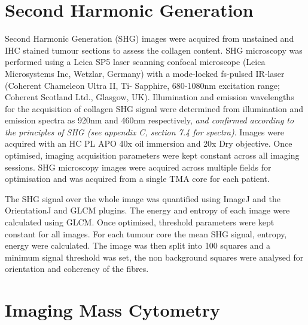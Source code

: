 \section{Second Harmonic Generation}

Second Harmonic Generation (SHG) images were acquired from unstained and IHC stained tumour
sections to assess the collagen content. SHG microscopy was
performed using a Leica SP5 laser scanning confocal microscope (Leica Microsystems Inc,
Wetzlar, Germany) with a mode‐locked fs‐pulsed IR‐laser (Coherent Chameleon Ultra II, Ti‐
Sapphire, 680‐1080nm excitation range; Coherent Scotland Ltd., Glasgow, UK). Illumination and emission wavelengths for the acquisition of collagen SHG signal were determined from illumination and emission spectra as 920nm and 460nm respectively, \textit{and confirmed according to the principles of SHG (see appendix C, section 7.4 for spectra)}. Images were acquired with an HC PL APO 40x oil immersion and 20x Dry objective. Once optimised, imaging acquisition parameters were kept constant across all imaging sessions. SHG microscopy images were acquired across multiple fields for optimisation and was acquired from a single TMA core for each patient. 

The SHG signal over the whole image was quantified using ImageJ and the OrientationJ and GLCM plugins. The energy and entropy of each image were calculated using GLCM. Once optimised, threshold parameters were kept constant for all images. For each tumour core the mean SHG signal, entropy, energy were calculated. The image was then split into 100 squares and a minimum signal threshold was set, the non background squares were analysed for orientation and coherency of the fibres. 

\section{Imaging Mass Cytometry}
